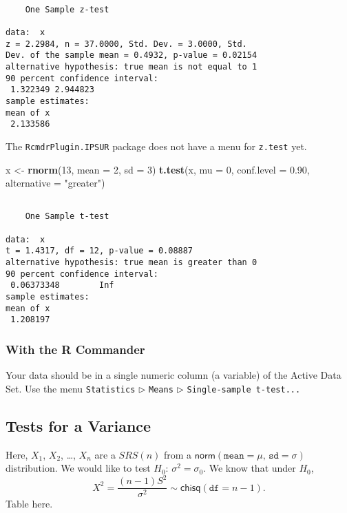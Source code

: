 \documentclass[]{book}
\newenvironment{Shaded}{\begin{snugshade}}{\end{snugshade}}
\newcommand{\KeywordTok}[1]{\textcolor[rgb]{0.13,0.29,0.53}{\textbf{{#1}}}}
\newcommand{\DataTypeTok}[1]{\textcolor[rgb]{0.13,0.29,0.53}{{#1}}}
\newcommand{\DecValTok}[1]{\textcolor[rgb]{0.00,0.00,0.81}{{#1}}}
\newcommand{\FloatTok}[1]{\textcolor[rgb]{0.00,0.00,0.81}{{#1}}}
\newcommand{\StringTok}[1]{\textcolor[rgb]{0.31,0.60,0.02}{{#1}}}
\newcommand{\NormalTok}[1]{{#1}}
\numberwithin{equation}{chapter}
\numberwithin{figure}{chapter}
\theoremstyle{plain}
\theoremstyle{definition}
\theoremstyle{remark}
\theoremstyle{definition}
\theoremstyle{definition}
\theoremstyle{remark}
\begin{document}
\begin{verbatim}

    One Sample z-test

data:  x
z = 2.2984, n = 37.0000, Std. Dev. = 3.0000, Std.
Dev. of the sample mean = 0.4932, p-value = 0.02154
alternative hypothesis: true mean is not equal to 1
90 percent confidence interval:
 1.322349 2.944823
sample estimates:
mean of x 
 2.133586 
\end{verbatim}

The \texttt{RcmdrPlugin.IPSUR} package \cite{RcmdrPlugin.IPSUR} does not
have a menu for \texttt{z.test} yet.

\begin{Shaded}
\begin{Highlighting}[]
\NormalTok{x <-}\StringTok{ }\KeywordTok{rnorm}\NormalTok{(}\DecValTok{13}\NormalTok{, }\DataTypeTok{mean =} \DecValTok{2}\NormalTok{, }\DataTypeTok{sd =} \DecValTok{3}\NormalTok{)}
\KeywordTok{t.test}\NormalTok{(x, }\DataTypeTok{mu =} \DecValTok{0}\NormalTok{, }\DataTypeTok{conf.level =} \FloatTok{0.90}\NormalTok{, }\DataTypeTok{alternative =} \StringTok{"greater"}\NormalTok{)}
\end{Highlighting}
\end{Shaded}

\begin{verbatim}

    One Sample t-test

data:  x
t = 1.4317, df = 12, p-value = 0.08887
alternative hypothesis: true mean is greater than 0
90 percent confidence interval:
 0.06373348        Inf
sample estimates:
mean of x 
 1.208197 
\end{verbatim}

\subsubsection{With the R Commander}\label{with-the-r-commander-1}

Your data should be in a single numeric column (a variable) of the
Active Data Set. Use the menu \texttt{Statistics} \(\triangleright\)
\texttt{Means} \(\triangleright\) \texttt{Single-sample\ t-test...}

\subsection{Tests for a Variance}\label{tests-for-a-variance}

Here, \(X_{1}\), \(X_{2}\), \ldots{}, \(X_{n}\) are a \(SRS(n)\) from a
\(\mathsf{norm}(\mathtt{mean} = \mu,\,\mathtt{sd} = \sigma)\)
distribution. We would like to test \(H_{0}:\,\sigma^{2} = \sigma_{0}\).
We know that under \(H_{0}\), \[ X^{2} = \frac{(n -
1)S^{2}}{\sigma^{2}} \sim \mathsf{chisq}(\mathtt{df} = n - 1).  \] Table
here.
\end{document}
